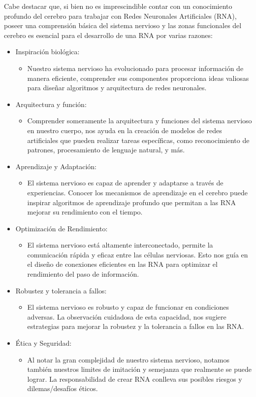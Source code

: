 Cabe destacar que, si bien no es imprescindible contar con un conocimiento profundo del cerebro para trabajar con Redes Neuronales Artificiales (RNA), poseer una comprensión básica del sistema nervioso y las zonas funcionales del cerebro es esencial para el desarrollo de una RNA por varias razones:
\begin{itemize}
 \item Inspiración biológica:
    \begin{itemize}
    \item Nuestro sistema nervioso ha evolucionado para procesar información de manera eficiente, comprender sus componentes proporciona ideas valiosas para diseñar algoritmos y arquitectura de redes neuronales. 
    \end{itemize}
 \item Arquitectura y función:
    \begin{itemize}
    \item Comprender someramente la arquitectura y funciones del sistema nervioso en nuestro cuerpo, nos ayuda en la creación de modelos de redes artificiales que pueden realizar tareas específicas, como reconocimiento de patrones, procesamiento de lenguaje natural, y más. 
    \end{itemize} 
 \item Aprendizaje y Adaptación:
    \begin{itemize}
    \item El sistema nervioso es capaz de aprender y adaptarse a través de experiencias. Conocer los mecanismos de aprendizaje en el cerebro puede inspirar algoritmos de aprendizaje profundo que permitan a las RNA mejorar su rendimiento con el tiempo.
    \end{itemize}
 \item Optimización de Rendimiento:
    \begin{itemize}
    \item El sistema nervioso está altamente interconectado, permite la comunicación rápida y eficaz entre las células nerviosas. Esto nos guía en el diseño de conexiones eficientes en las RNA para optimizar el rendimiento del paso de información.
    \end{itemize}
 \item Robustez y tolerancia a fallos:
    \begin{itemize}
    \item El sistema nervioso es robusto y capaz de funcionar en condiciones adversas. La observación cuidadosa de esta capacidad, nos sugiere estrategias para mejorar la robustez y la tolerancia a fallos en las RNA.
    \end{itemize}
 \item Ética y Seguridad:
    \begin{itemize}
    \item Al notar la gran complejidad de nuestro sistema nervioso, notamos también nuestros limites de imitación y semejanza que realmente se puede lograr. La responsabilidad de crear RNA conlleva sus posibles riesgos y dilemas/desafíos éticos.
    \end{itemize}
\end{itemize}


